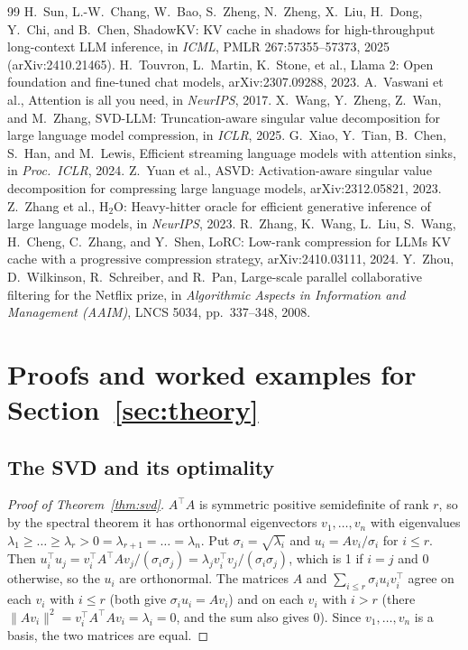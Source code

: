 \documentclass[10pt]{article}
\theoremstyle{plain}
\theoremstyle{definition}
\theoremstyle{remark}
\newcommand{\T}{^{\top}}
\newcommand{\norm}[1]{\lVert #1\rVert}
\begin{document}
{\begin{thebibliography}{99}
 H.~Sun, L.-W.~Chang, W.~Bao, S.~Zheng, N.~Zheng, X.~Liu, H.~Dong, Y.~Chi, and B.~Chen, ShadowKV: KV cache in shadows for high-throughput long-context LLM inference, in \emph{ICML}, PMLR 267:57355--57373, 2025 (arXiv:2410.21465).
 H.~Touvron, L.~Martin, K.~Stone, et al., Llama 2: Open foundation and fine-tuned chat models, arXiv:2307.09288, 2023.
 A.~Vaswani et al., Attention is all you need, in \emph{NeurIPS}, 2017.
 X.~Wang, Y.~Zheng, Z.~Wan, and M.~Zhang, SVD-LLM: Truncation-aware singular value decomposition for large language model compression, in \emph{ICLR}, 2025.
 G.~Xiao, Y.~Tian, B.~Chen, S.~Han, and M.~Lewis, Efficient streaming language models with attention sinks, in \emph{Proc.\ ICLR}, 2024.
 Z.~Yuan et al., ASVD: Activation-aware singular value decomposition for compressing large language models, arXiv:2312.05821, 2023.
 Z.~Zhang et al., H$_2$O: Heavy-hitter oracle for efficient generative inference of large language models, in \emph{NeurIPS}, 2023.
 R.~Zhang, K.~Wang, L.~Liu, S.~Wang, H.~Cheng, C.~Zhang, and Y.~Shen, LoRC: Low-rank compression for LLMs KV cache with a progressive compression strategy, arXiv:2410.03111, 2024.
 Y.~Zhou, D.~Wilkinson, R.~Schreiber, and R.~Pan, Large-scale parallel collaborative filtering for the Netflix prize, in \emph{Algorithmic Aspects in Information and Management (AAIM)}, LNCS 5034, pp.~337--348, 2008.
\end{thebibliography}
}

\appendix
\section{Proofs and worked examples for Section~\ref{sec:theory}}
\label{app:proofs}

\subsection{The SVD and its optimality}

\begin{proof}[Proof of Theorem~\ref{thm:svd}]
$A\T A$ is symmetric positive semidefinite of rank $r$, so by the spectral theorem it has orthonormal eigenvectors $v_1,\dots,v_n$ with eigenvalues $\lambda_1\ge\dots\ge\lambda_r>0=\lambda_{r+1}=\dots=\lambda_n$. Put $\sigma_i=\sqrt{\lambda_i}$ and $u_i=Av_i/\sigma_i$ for $i\le r$. Then $u_i\T u_j=v_i\T A\T Av_j/(\sigma_i\sigma_j)=\lambda_jv_i\T v_j/(\sigma_i\sigma_j)$, which is 1 if $i=j$ and 0 otherwise, so the $u_i$ are orthonormal. The matrices $A$ and $\sum_{i\le r}\sigma_iu_iv_i\T$ agree on each $v_i$ with $i\le r$ (both give $\sigma_iu_i=Av_i$) and on each $v_i$ with $i>r$ (there $\norm{Av_i}^2=v_i\T A\T Av_i=\lambda_i=0$, and the sum also gives 0). Since $v_1,\dots,v_n$ is a basis, the two matrices are equal.
\end{proof}
\end{document}

